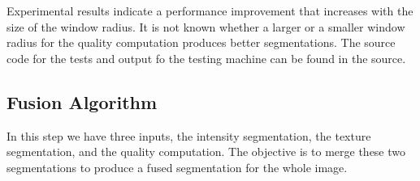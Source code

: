 \documentclass[twocolumn]{article}
\begin{document}
Experimental results indicate a performance improvement that
increases with the size of the window radius. It is not known 
whether a larger or a smaller window radius for the quality computation 
produces better segmentations. The source code for the tests and output fo
the testing machine can be found in the source.

\subsection{Fusion Algorithm}

In this step we have three inputs, the intensity segmentation, the
texture segmentation, and the quality computation. The objective is to
merge these two segmentations to produce a fused segmentation for the
whole image. 

\begin{figure}[!t]
\centering
{}
\hfil
{}\\

\end{figure}
\end{document}
